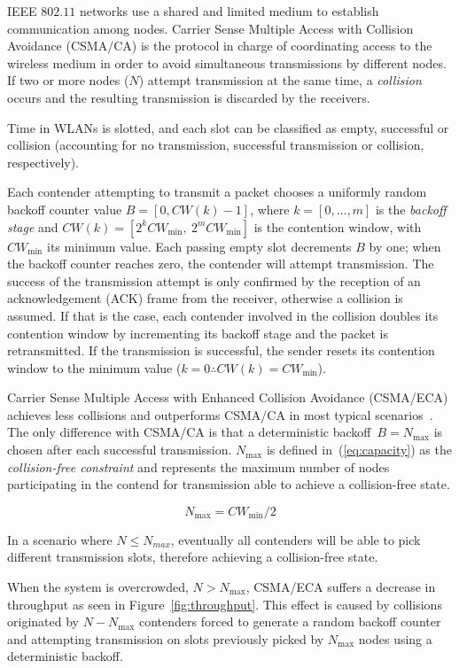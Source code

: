 IEEE $802.11$ networks use a shared and limited medium to establish communication among nodes. Carrier Sense Multiple Access with Collision Avoidance (CSMA/CA) is the protocol in charge of coordinating access to the wireless medium in order to avoid simultaneous transmissions by different nodes. If two or more nodes ($N$) attempt transmission at the same time, a \emph{collision} occurs and the resulting transmission is discarded by the receivers.



Time in WLANs is slotted, and each slot can be classified as empty, successful or collision (accounting for no transmission, successful transmission or collision, respectively).

Each contender attempting to transmit a packet chooses a uniformly random backoff counter value $B = [0,CW(k)-1]$, where $k=[0,\ldots,m]$ is the \emph{backoff stage} and $CW(k)=[2^{k}CW_{\min},~2^{m}CW_{\min}]$ is the contention window, with $CW_{\min}$ its minimum value. Each passing empty slot decrements $B$ by one; when the backoff counter reaches zero, the contender will attempt transmission. The success of the transmission attempt is only confirmed by the reception of an acknowledgement (ACK) frame from the receiver, otherwise a collision is assumed. If that is the case, each contender involved in the collision doubles its contention window by incrementing its backoff stage and the packet is retransmitted. If the transmission is successful, the sender resets its contention window to the minimum value ($k=0\therefore CW(k)=CW_{\min}$).

Carrier Sense Multiple Access with Enhanced Collision Avoidance (CSMA/ECA) achieves less collisions and outperforms CSMA/CA in most typical scenarios~\cite{CSMA_ECA}. The only difference with CSMA/CA is that a deterministic backoff~$B=N_{\max}$ is chosen after each successful transmission. $N_{\max}$ is defined in~(\ref{eq:capacity}) as the \emph{collision-free constraint} and represents the maximum number of nodes participating in the contend for transmission able to achieve a collision-free state.

\begin{equation} \label{eq:capacity}	
	N_{\max} = CW_{\min}/2
\end{equation}

In a scenario where $N \leq N_{max}$, eventually all contenders will be able to pick different transmission slots, therefore achieving a collision-free state.

When the system is overcrowded, $N>N_{\max}$, CSMA/ECA suffers a decrease in throughput as seen in Figure~\ref{fig:throughput}. This effect is caused by collisions originated by $N-N_{\max}$ contenders forced to generate a random backoff counter and attempting transmission on slots previously picked by $N_{\max}$ nodes using a deterministic backoff.


